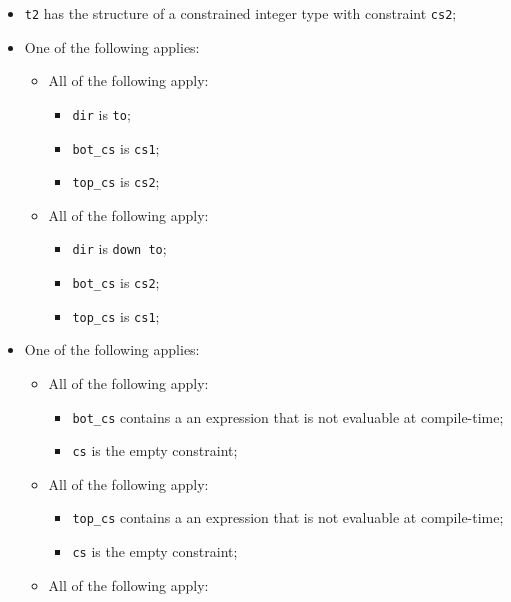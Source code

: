 \documentclass{book}
\begin{document}
\begin{itemize}
\begin{itemize}
\begin{itemize}
\begin{itemize}
           \item \texttt{t2} has the structure of a constrained integer type with constraint \texttt{cs2};
           \item One of the following applies:
             \begin{itemize}
               \item All of the following apply:
                 \begin{itemize}
                   \item \texttt{dir} is \texttt{to};
                   \item \texttt{bot\_cs} is \texttt{cs1};
                   \item \texttt{top\_cs} is \texttt{cs2};
                 \end{itemize}
               \item All of the following apply:
                 \begin{itemize}
                   \item \texttt{dir} is \texttt{down to};
                   \item \texttt{bot\_cs} is \texttt{cs2};
                   \item \texttt{top\_cs} is \texttt{cs1};
                 \end{itemize}
             \end{itemize}
           \item One of the following applies:
             \begin{itemize}
               \item All of the following apply:
                 \begin{itemize}
                   \item \texttt{bot\_cs} contains a an expression that is not evaluable at compile-time;
                   \item \texttt{cs} is the empty constraint;
                 \end{itemize}
               \item All of the following apply:
                 \begin{itemize}
                   \item \texttt{top\_cs} contains a an expression that is not evaluable at compile-time;
                   \item \texttt{cs} is the empty constraint;
                 \end{itemize}
               \item All of the following apply:

\end{itemize}
\end{itemize}
\end{itemize}
\end{itemize}
\end{itemize}
\end{document}
